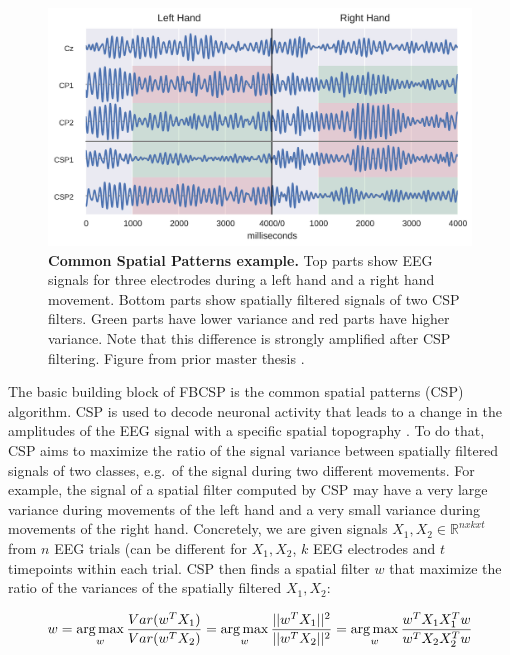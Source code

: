 \begin{figure}[th]
    \myfloatalign
    \includegraphics[width=1\linewidth]{images/Methods_Common_Spatial_Patterns_18_0.png}
    \caption[Common Spatial Patterns example.]{
\textbf{Common Spatial Patterns example.} Top parts show EEG
signals for three electrodes during a left hand and a right hand
movement. Bottom parts show spatially filtered signals of two CSP
filters. Green parts have lower variance and red parts have higher
variance. Note that this difference is strongly amplified after CSP
filtering. Figure from prior master thesis
\citep{schirrmeister_msc_thesis_2015}.}\label{csp-figure}
\end{figure}


    The basic building block of FBCSP is the common spatial patterns (CSP)
algorithm. CSP is used to decode neuronal activity that leads to a
change in the amplitudes of the EEG signal with a specific spatial
topography \citep{koles_spatial_1990,ramoser_optimal_2000,blankertz_optimizing_2008}.
To do that, CSP aims to maximize the ratio of the signal variance
between spatially filtered signals of two classes, e.g.~of the signal
during two different movements. For example, the signal of a spatial
filter computed by CSP may have a very large variance during movements
of the left hand and a very small variance during movements of the right
hand. Concretely, we are given signals
$X_{1}, X_{2} \in \mathbb{R}^{n x k x t}$ from $n$ EEG trials (can
be different for $X_1, X_2$, $k$ EEG electrodes and $t$
timepoints within each trial. CSP then finds a spatial filter $w$ that
maximize the ratio of the variances of the spatially filtered
$X_1,X_2$:

\begin{equation*}
w=\operatorname*{arg\,max}_w\frac{Var(w^T X_1)}{Var(w^T X_2)}= \operatorname*{arg\,max}_w\frac{||w^T X_1||^2}{||w^T X_2||^2}=\operatorname*{arg\,max}_w\frac{w^T X_1 X_1^T w}{w^T X_2 X_2^T w}
\end{equation*}

